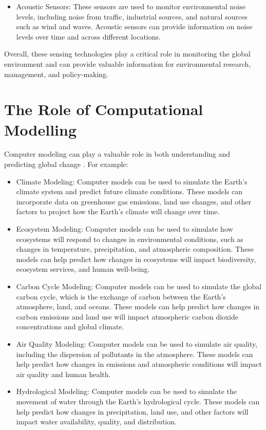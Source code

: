 \begin{itemize}
\begin{itemize}
  \item Acoustic Sensors: These sensors are used to monitor environmental noise levels, including noise from traffic, industrial sources, and natural sources such as wind and waves. Acoustic sensors can provide information on noise levels over time and across different locations.
  \end{itemize}
\end{itemize}

Overall, these sensing technologies play a critical role in monitoring the global environment and can provide valuable information for environmental research, management, and policy-making.

\section{The Role of Computational Modelling}

Computer modeling can play a valuable role in both understanding and predicting global change \cite{Chen2019, Hantson2016, DeLucia2021, Oleson2013, Clark2016}. For example:
\begin{itemize}
\item Climate Modeling: Computer models can be used to simulate the Earth's climate system and predict future climate conditions. These models can incorporate data on greenhouse gas emissions, land use changes, and other factors to project how the Earth's climate will change over time.
\item Ecosystem Modeling: Computer models can be used to simulate how ecosystems will respond to changes in environmental conditions, such as changes in temperature, precipitation, and atmospheric composition. These models can help predict how changes in ecosystems will impact biodiversity, ecosystem services, and human well-being.
\item Carbon Cycle Modeling: Computer models can be used to simulate the global carbon cycle, which is the exchange of carbon between the Earth's atmosphere, land, and oceans. These models can help predict how changes in carbon emissions and land use will impact atmospheric carbon dioxide concentrations and global climate.
\item Air Quality Modeling: Computer models can be used to simulate air quality, including the dispersion of pollutants in the atmosphere. These models can help predict how changes in emissions and atmospheric conditions will impact air quality and human health.
\item Hydrological Modeling: Computer models can be used to simulate the movement of water through the Earth's hydrological cycle. These models can help predict how changes in precipitation, land use, and other factors will impact water availability, quality, and distribution.
\end{itemize}

